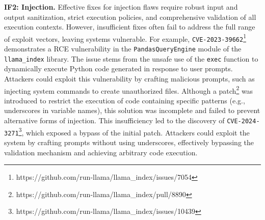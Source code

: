\noindent \textbf{IF2: Injection.}  
Effective fixes for injection flaws require robust input and output sanitization, strict execution policies, and comprehensive validation of all execution contexts. However, insufficient fixes often fail to address the full range of exploit vectors, leaving systems vulnerable. For example, \texttt{CVE-2023-39662}\footnote{https://github.com/run-llama/llama\_index/issues/7054} demonstrates a RCE vulnerability in the \texttt{PandasQueryEngine} module of the \texttt{llama\_index} library. The issue stems from the unsafe use of the \texttt{exec} function to dynamically execute Python code generated in response to user prompts. Attackers could exploit this vulnerability by crafting malicious prompts, such as injecting system commands to create unauthorized files. Although a patch\footnote{https://github.com/run-llama/llama\_index/pull/8890} was introduced to restrict the execution of code containing specific patterns (e.g., underscores in variable names), this solution was incomplete and failed to prevent alternative forms of injection.
This insufficiency led to the discovery of \texttt{CVE-2024-3271}\footnote{https://github.com/run-llama/llama\_index/issues/10439}, which exposed a bypass of the initial patch. Attackers could exploit the system by crafting prompts without using underscores, effectively bypassing the validation mechanism and achieving arbitrary code execution.


